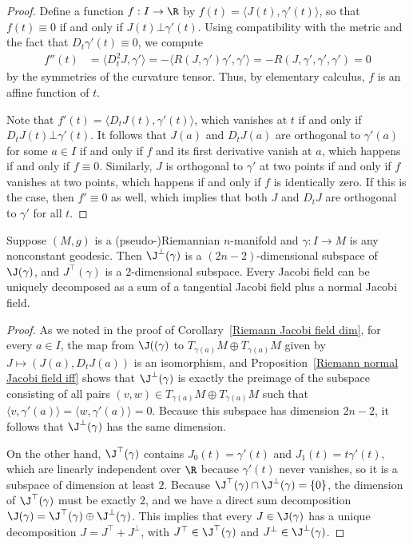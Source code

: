 \begin{proof}
Define a function $f:I\to\R$ by $f(t)=\langle J(t),\gamma'(t)\rangle$, so that $f(t)\equiv 0$ if and only if $J(t)\bot\gamma'(t)$. Using compatibility with the metric 
and the fact that $D_t\gamma'(t)\equiv 0$, we compute
\begin{align*}
f''(t)&=\langle D_t^2J,\gamma'\rangle=-\langle R(J,\gamma')\gamma',\gamma'\rangle=-R(J,\gamma',\gamma',\gamma')=0
\end{align*}
by the symmetries of the curvature tensor. Thus, by elementary calculus, $f$ is an affine function of $t$.\par
Note that $f'(t)=\langle D_tJ(t),\gamma'(t)\rangle$, which vanishes at $t$ if and only if $D_tJ(t)\bot\gamma'(t)$. It follows that $J(a)$ and $D_tJ(a)$ are orthogonal 
to $\gamma'(a)$ for some $a\in I$ if and only if $f$ and its first derivative vanish at $a$, which happens if and only if $f\equiv 0$. Similarly, $J$ is orthogonal to 
$\gamma'$ at two points if and only if $f$ vanishes at two points, which happens if and only if $f$ is identically zero. If this is the case, then $f'\equiv 0$ as well, 
which implies that both $J$ and $D_tJ$ are orthogonal to $\gamma'$ for all $t$.
\end{proof}
\begin{corollary}\label{Riemann Jaboci tangential normal dim}
Suppose $(M,g)$ is a (pseudo-)Riemannian $n$-manifold and $\gamma:I\to M$ is any nonconstant geodesic. Then $\J^{\bot}(\gamma)$ is a $(2n-2)$-dimensional 
subspace of $\J(\gamma)$, and $J^{\top}(\gamma)$ is a $2$-dimensional subspace. Every Jacobi field can be uniquely decomposed as a sum of a tangential Jacobi field plus 
a normal Jacobi field.
\end{corollary}
\begin{proof}
As we noted in the proof of Corollary~\ref{Riemann Jacobi field dim}, for every $a\in I$, the map from $\J((\gamma)$ to $T_{\gamma(a)}M\oplus T_{\gamma(a)}M$ given by 
$J\mapsto(J(a),D_tJ(a))$ is an isomorphism, and Proposition~\ref{Riemann normal Jacobi field iff} shows that $\J^{\bot}(\gamma)$ is exactly the preimage of the subspace 
consisting of all pairs $(v,w)\in T_{\gamma(a)}M\oplus T_{\gamma(a)}M$ such that $\langle v,\gamma'(a)\rangle=\langle w,\gamma'(a)\rangle=0$. Because this subspace has 
dimension $2n-2$, it follows that $\J^{\bot}(\gamma)$ has the same dimension.\par
On the other hand, $\J^{\top}(\gamma)$ contains $J_0(t)=\gamma'(t)$ and $J_1(t)=t\gamma'(t)$, which are linearly independent over $\R$ because $\gamma'(t)$ never 
vanishes, so it is a subspace of dimension at least $2$. Because $\J^{\top}(\gamma)\cap\J^{\bot}(\gamma)=\{0\}$, the dimension of $\J^{\top}(\gamma)$ must be exactly $2$, 
and we have a direct sum decomposition $\J(\gamma)=\J^{\top}(\gamma)\oplus\J^{\bot}(\gamma)$. This implies that every $J\in\J(\gamma)$ has a unique decomposition $J=J^{\top}+J^{\bot}$, 
with $J^{\top}\in\J^{\top}(\gamma)$ and $J^{\bot}\in\J^{\bot}(\gamma)$.
\end{proof}
